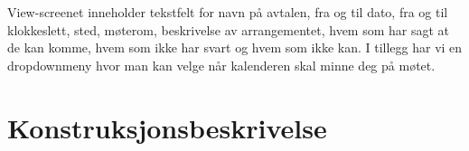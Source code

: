 \documentclass{article}
\begin{document}
View-screenet inneholder tekstfelt for navn på avtalen, fra og til dato, fra og til klokkeslett, sted, møterom, beskrivelse av arrangementet, hvem som har sagt at de kan komme, hvem som ikke har svart og hvem som ikke kan. I tillegg har vi en dropdownmeny hvor man kan velge når kalenderen skal minne deg på møtet.





\section{Konstruksjonsbeskrivelse}
\end{document}
